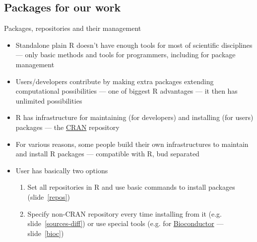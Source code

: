 \documentclass[compress, ucs, xelatex, 11pt, xcolor=svgnames, aspectratio=169,
	hyperref={
		bookmarks=true,
		unicode=true,
		colorlinks=true,
		pdftitle={Molecular data in R},
		plainpages=false,
		pdfauthor={Vojtech Zeisek},
		pdfsubject={Course about phylogeny and evolution in R},
		pdfcreator={XeLaTeX},
		pdfkeywords={R, evolution, phylogeny, molecular data},
		linkcolor=Crimson, %
		anchorcolor=Magenta, %
		citecolor=Magenta, %
		filecolor=Magenta, %
		menucolor=Magenta, %
		urlcolor=DodgerBlue, %
		pdftex},
	url={hyphens, lowtilde} %
	]{beamer}
\begin{document}
\subsection{Packages for our work}

\begin{frame}{Packages, repositories and their management}
	\begin{itemize}
		\item Standalone plain R doesn't have enough tools for most of scientific disciplines --- only basic methods and tools for programmers, including for package management
		\item Users/developers contribute by making extra packages extending computational possibilities --- one of biggest R advantages --- it then has unlimited possibilities
		\item R has infrastructure for maintaining (for developers) and installing (for users) packages --- the \href{https://CRAN.R-project.org/}{CRAN} repository
		\item For various reasons, some people build their own infrastructures to maintain and install R packages --- compatible with R, bud separated
		\item User has basically two options
		\begin{enumerate}
			\item Set all repositories in R and use basic commands to install packages (slide~\ref{repos})
			\item Specify non-CRAN repository every time installing from it (e.g. slide~\ref{sources-diff}) or use special tools (e.g. for \href{https://bioconductor.org/install/}{Bioconductor} --- slide~\ref{bioc})
		\end{enumerate}
	\end{itemize}
\end{frame}
\end{document}
